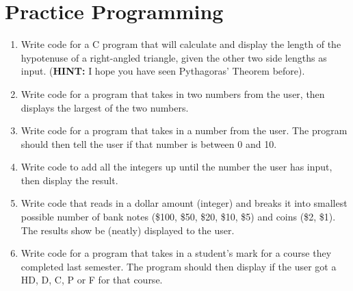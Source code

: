 \documentclass{pass}
\begin{document}
\section*{Practice Programming}
\begin{enumerate}[resume]
\item Write code for a C program that will calculate and display the length of the hypotenuse of a right-angled triangle, given the other two side lengths as input. (\textbf{HINT:} I hope you have seen Pythagoras' Theorem before). \\

\item Write code for a program that takes in two numbers from the user, then displays the largest of the two numbers. \\

\item Write code for a program that takes in a number from the user. The program should then tell the user if that number is between 0 and 10. \\

\item Write code to add all the integers up until the number the user has input, then display the result. \\

\item Write code that reads in a dollar amount (integer) and breaks it into smallest possible number of bank notes (\$100, \$50, \$20, \$10, \$5) and coins (\$2, \$1). The results show be (neatly) displayed to the user. \\

\item Write code for a program that takes in a student’s mark for a course they completed last semester. The program should then display if the user got a HD, D, C, P or F for that course. \\



\end{enumerate}
\end{document}
